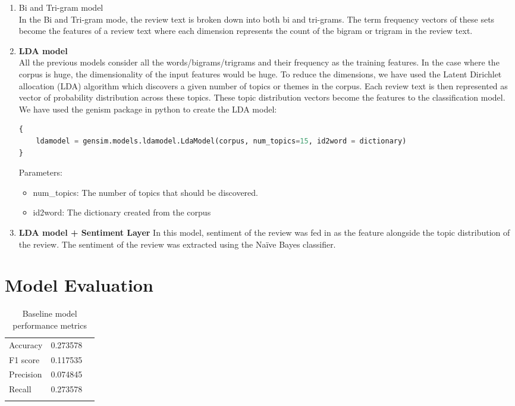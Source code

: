 \documentclass[paper=a4, fontsize=11pt]{scrartcl} %
\numberwithin{equation}{section} %
\numberwithin{figure}{section} %
\numberwithin{table}{section} %
\begin{document}
\begin{enumerate}
\item Bi and Tri-gram model\\
In the Bi and Tri-gram mode, the review text is broken down into both bi and tri-grams. The term frequency vectors of these sets become the features of a review text where each dimension represents the count of the bigram or trigram in the review text.

\item \textbf{LDA model}\\
All the previous models consider all the words/bigrams/trigrams and their frequency as the training features. In the case where the corpus is huge, the dimensionality of the input features would be huge. To reduce the dimensions, we have used the Latent Dirichlet allocation (LDA) algorithm which discovers a given number of topics or themes in the corpus. Each review text is then represented as vector of probability distribution across these topics. These topic distribution vectors become the features to the classification model.
We have used the genism package in python to create the LDA model:
\begin{lstlisting}[language=python]
{
	ldamodel = gensim.models.ldamodel.LdaModel(corpus, num_topics=15, id2word = dictionary)
}
\end{lstlisting}

Parameters:
\begin{itemize}
\item num\_topics:  The number of topics that should be discovered.
\item id2word: The dictionary created from the corpus
\end{itemize}

\item \textbf{LDA model + Sentiment Layer}
In this model, sentiment of the review was fed in as the feature alongside the topic distribution of the review. The sentiment of the review was extracted using the Naïve Bayes classifier. 
\end{enumerate}

\section{Model Evaluation}
\begin{table}[!htb]
 \centering
 \caption{Baseline model performance metrics}
 \label{baseline_performance}
 \begin{tabular}{l l l} 
    \noalign{\smallskip}\hline\noalign{\smallskip}
    Accuracy & 0.273578\\
    F1 score & 0.117535\\
    Precision & 0.074845\\
    Recall &0.273578\\
    \noalign{\smallskip}\hline
  \end{tabular} 
\end{table}  
\end{document}
